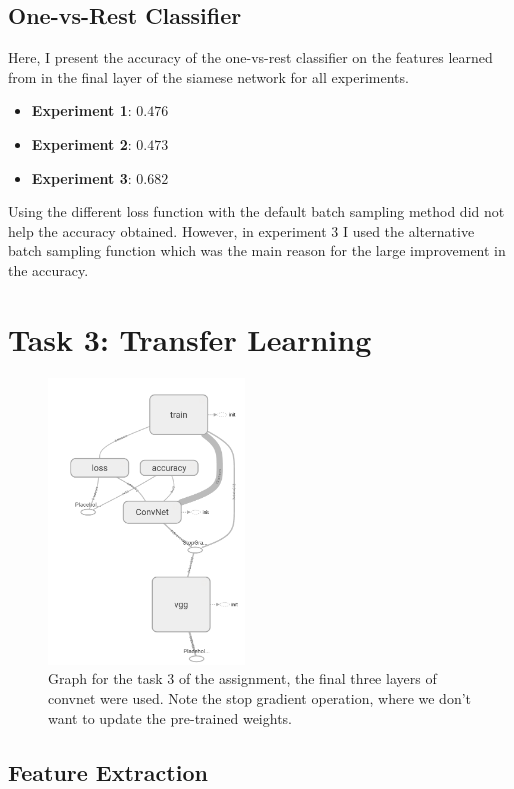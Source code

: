 \documentclass{article}
\begin{document}
\subsection{One-vs-Rest Classifier}

Here, I present the accuracy of the one-vs-rest classifier on the features learned from in the final layer of the siamese network for all experiments.

\begin{itemize}
\item \textbf{Experiment 1}: $0.476$
\item \textbf{Experiment 2}: $0.473$
\item \textbf{Experiment 3}: $\mathbf{0.682}$
\end{itemize}

Using the different loss function with the default batch sampling method did not help the accuracy obtained.
However, in experiment 3 I used the alternative batch sampling function which was the main reason for the large improvement in the accuracy.




\clearpage

\section{Task 3: Transfer Learning}
 
 
\begin{figure}[h!]
\centering
\includegraphics[width=5.2cm]{graph.png}
\caption{Graph for the task 3 of the assignment, the final three layers of convnet were used. Note the stop gradient operation, where we don't want to update the pre-trained weights.}
\label{fig:graph}
\end{figure}

\subsection{Feature Extraction}
\end{document}
